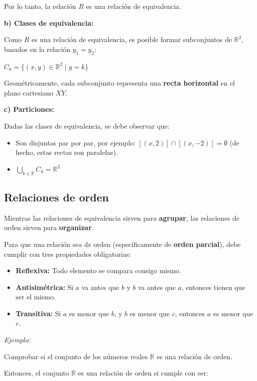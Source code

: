 \documentclass{article}
\begin{document}
Por lo tanto, la relación $R$ es una relación de equivalencia.

\textbf{b) Clases de equivalencia:}

Como $R$ es una relación de equivalencia, es posible formar subconjuntos de $\mathbb{R}^2$, basados en la relación $y_1 = y_2$:

$C_k = \{(x, y) \in \mathbb{R}^2 \mid y = k\}$

Geométricamente, cada subconjunto representa una \textbf{recta horizontal} en el plano cartesiano $XY$.

\textbf{c) Particiones:}

Dadas las clases de equivalencia, se debe observar que:

\begin{itemize}
    \item Son disjuntas par por par, por ejemplo: $\left[(x, 2)\right] \cap \left[(x, -2)\right] = \emptyset$ (de hecho, estas rectas son paralelas).
    \item $\bigcup_{k \in \mathbb{R}} C_k = \mathbb{R}^2$
\end{itemize}

\subsection{Relaciones de orden}

Mientras las relaciones de equivalencia sirven para \textbf{agrupar}, las relaciones de orden sirven para \textbf{organizar}.

Para que una relación sea de orden (específicamente de \textbf{orden parcial}), debe cumplir con tres propiedades obligatorias:

\begin{itemize}
    \item \textbf{Reflexiva:} Todo elemento se compara consigo mismo.
    \item \textbf{Antisimétrica:} Si $a$ va antes que $b$ y $b$ va antes que $a$, entonces tienen que ser el mismo.
    \item \textbf{Transitiva:} Si $a$ es menor que $b$, y $b$ es menor que $c$, entonces $a$ es menor que $c$.
\end{itemize}

\textit{Ejemplo:}

Comprobar si el conjunto de los números reales $\mathbb{R}$ es una relación de orden.

Entonces, el conjunto $\mathbb{R}$ es una relación de orden si cumple con ser:
\end{document}
